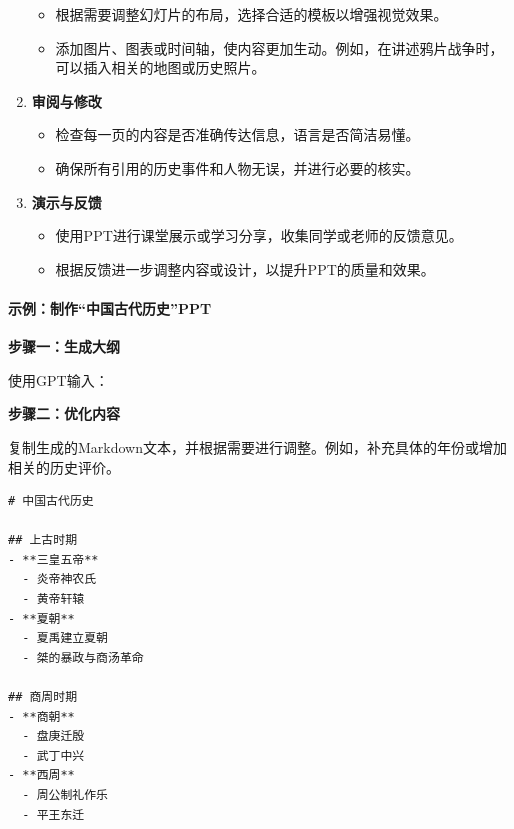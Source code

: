 \begin{enumerate}
\begin{itemize}
          \item
                根据需要调整幻灯片的布局，选择合适的模板以增强视觉效果。
          \item
                添加图片、图表或时间轴，使内容更加生动。例如，在讲述鸦片战争时，可以插入相关的地图或历史照片。
        \end{itemize}
  \item
        \textbf{审阅与修改}

        \begin{itemize}

          \item
                检查每一页的内容是否准确传达信息，语言是否简洁易懂。
          \item
                确保所有引用的历史事件和人物无误，并进行必要的核实。
        \end{itemize}
  \item
        \textbf{演示与反馈}

        \begin{itemize}

          \item
                使用PPT进行课堂展示或学习分享，收集同学或老师的反馈意见。
          \item
                根据反馈进一步调整内容或设计，以提升PPT的质量和效果。
        \end{itemize}
\end{enumerate}

\hypertarget{ux793aux4f8bux5236ux4f5cux4e2dux56fdux53e4ux4ee3ux5386ux53f2ppt}{%
  \paragraph{示例：制作``中国古代历史''PPT}\label{ux793aux4f8bux5236ux4f5cux4e2dux56fdux53e4ux4ee3ux5386ux53f2ppt}}

\textbf{步骤一：生成大纲}

使用GPT输入：

\textbf{步骤二：优化内容}

复制生成的Markdown文本，并根据需要进行调整。例如，补充具体的年份或增加相关的历史评价。

\begin{lstlisting}
# 中国古代历史

## 上古时期
- **三皇五帝**
  - 炎帝神农氏
  - 黄帝轩辕
- **夏朝**
  - 夏禹建立夏朝
  - 桀的暴政与商汤革命

## 商周时期
- **商朝**
  - 盘庚迁殷
  - 武丁中兴
- **西周**
  - 周公制礼作乐
  - 平王东迁
\end{lstlisting}

